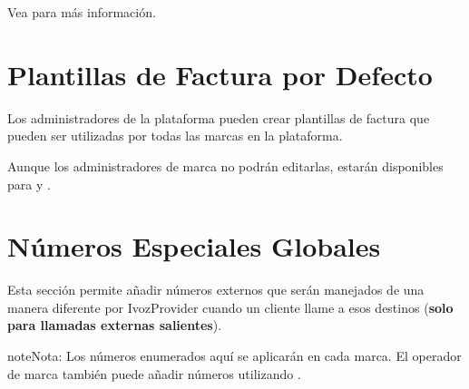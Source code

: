 \documentclass[letterpaper,10pt,spanish]{sphinxmanual}
\begin{document}
Vea {\hyperref[administration_portal/brand/settings/notification_templates:notification\string-templates]{}} para más información.


\section{Plantillas de Factura por Defecto}
\label{administration_portal/platform/default_invoice_templates::doc}\label{administration_portal/platform/default_invoice_templates:default-invoice-templates}\label{administration_portal/platform/default_invoice_templates:id1}
Los administradores de la plataforma pueden crear plantillas de factura que pueden ser utilizadas por todas las marcas en la plataforma.

Aunque los administradores de marca no podrán editarlas, estarán disponibles para {\hyperref[administration_portal/brand/invoicing/invoices:invoices]{}} y {\hyperref[administration_portal/brand/invoicing/invoice_schedulers:invoice\string-schedulers]{}}.


\section{Números Especiales Globales}
\label{administration_portal/platform/global_special_numbers:global-special-numbers}\label{administration_portal/platform/global_special_numbers::doc}\label{administration_portal/platform/global_special_numbers:id1}
Esta sección permite añadir números externos que serán manejados de una manera diferente por IvozProvider cuando un cliente llame a esos destinos (\textbf{solo para llamadas externas salientes}).

\begin{notice}{note}{Nota:}
Los números enumerados aquí se aplicarán en cada marca. El operador de marca también puede añadir números utilizando {\hyperref[administration_portal/brand/settings/special_numbers:special\string-numbers]{}}.
\end{notice}
\end{document}
